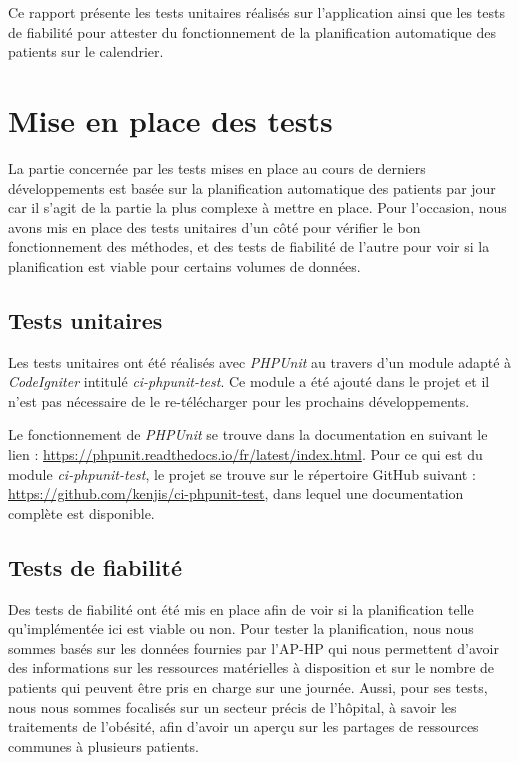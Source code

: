 \documentclass{polytech/polytech}
\begin{document}
Ce rapport présente les tests unitaires réalisés sur l'application ainsi que les tests de fiabilité pour attester du fonctionnement de la planification automatique des patients sur le calendrier.

\section{Mise en place des tests}

La partie concernée par les tests mises en place au cours de derniers développements est basée sur la planification automatique des patients par jour car il s'agit de la partie la plus complexe à mettre en place. Pour l'occasion, nous avons mis en place des tests unitaires d'un côté pour vérifier le bon fonctionnement des méthodes, et des tests de fiabilité de l'autre pour voir si la planification est viable pour certains volumes de données.

\subsection{Tests unitaires}

Les tests unitaires ont été réalisés avec \textit{PHPUnit} au travers d'un module adapté à \textit{CodeIgniter} intitulé \textit{ci-phpunit-test}. Ce module a été ajouté dans le projet et il n'est pas nécessaire de le re-télécharger pour les prochains développements. 

Le fonctionnement de \textit{PHPUnit} se trouve dans la documentation en suivant le lien : \url{https://phpunit.readthedocs.io/fr/latest/index.html}. Pour ce qui est du module \textit{ci-phpunit-test}, le projet se trouve sur le répertoire GitHub suivant : \url{https://github.com/kenjis/ci-phpunit-test}, dans lequel une documentation complète est disponible.

\subsection{Tests de fiabilité}

Des tests de fiabilité ont été mis en place afin de voir si la planification telle qu'implémentée ici est viable ou non. Pour tester la planification, nous nous sommes basés sur les données fournies par l'AP-HP qui nous permettent d'avoir des informations sur les ressources matérielles à disposition et sur le nombre de patients qui peuvent être pris en charge sur une journée. Aussi, pour ses tests, nous nous sommes focalisés sur un secteur précis de l'hôpital, à savoir les traitements de l'obésité, afin d'avoir un aperçu sur les partages de ressources communes à plusieurs patients. 
\end{document}
